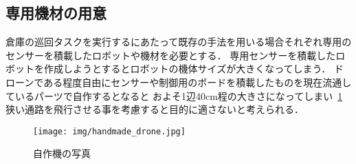 \subsection{専用機材の用意}
\label{equipment_problem}
倉庫の巡回タスクを実行するにあたって既存の手法を用いる場合それぞれ専用のセンサーを積載したロボットや機材を必要とする．
専用センサーを積載したロボットを作成しようとするとロボットの機体サイズが大きくなってしまう．
ドローンである程度自由にセンサーや制御用のボードを積載したものを現在流通しているパーツで自作するとなると
およそ1辺40cm程の大きさになってしまい~\ref{handmade_drone}狭い通路を飛行させる事を考慮すると目的に適さないと考えられる．

\begin{figure}[htbp]
    \begin{center}
      \texttt{[image: img/handmade\_drone.jpg]}
      \caption{自作機の写真}
      \label{handmade_drone}
    \end{center}
  \end{figure}